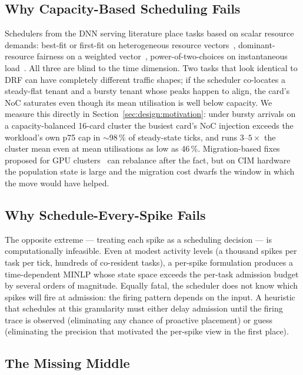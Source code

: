 \documentclass[letterpaper,twocolumn,10pt]{article}
\begin{document}
\subsection{Why Capacity-Based Scheduling Fails}
\label{sec:bg:capacity}

Schedulers from the DNN serving literature place tasks based on scalar resource demands: best-fit or first-fit on heterogeneous resource vectors~\cite{panigrahy2011heuristics}, dominant-resource fairness on a weighted vector~\cite{ghodsi2011dominant}, power-of-two-choices on instantaneous load~\cite{mohan2022looking}. All three are blind to the time dimension. Two tasks that look identical to DRF can have completely different traffic shapes; if the scheduler co-locates a steady-flat tenant and a bursty tenant whose peaks happen to align, the card's NoC saturates even though its mean utilisation is well below capacity. We measure this directly in Section~\ref{sec:design:motivation}: under bursty arrivals on a capacity-balanced 16-card cluster the busiest card's NoC injection exceeds the workload's own p75 cap in $\sim$98\,\% of steady-state ticks, and runs $3$--$5\times$ the cluster mean even at mean utilisations as low as 46\,\%. Migration-based fixes proposed for GPU clusters~\cite{xiao2018gandiva, weng2023beware} can rebalance after the fact, but on CIM hardware the population state is large and the migration cost dwarfs the window in which the move would have helped.

\subsection{Why Schedule-Every-Spike Fails}
\label{sec:bg:perspike}

The opposite extreme --- treating each spike as a scheduling decision --- is computationally infeasible. Even at modest activity levels (a thousand spikes per task per tick, hundreds of co-resident tasks), a per-spike formulation produces a time-dependent MINLP whose state space exceeds the per-task admission budget by several orders of magnitude. Equally fatal, the scheduler does not know which spikes will fire at admission: the firing pattern depends on the input. A heuristic that schedules at this granularity must either delay admission until the firing trace is observed (eliminating any chance of proactive placement) or guess (eliminating the precision that motivated the per-spike view in the first place).

\subsection{The Missing Middle}
\label{sec:bg:middle}
\end{document}

